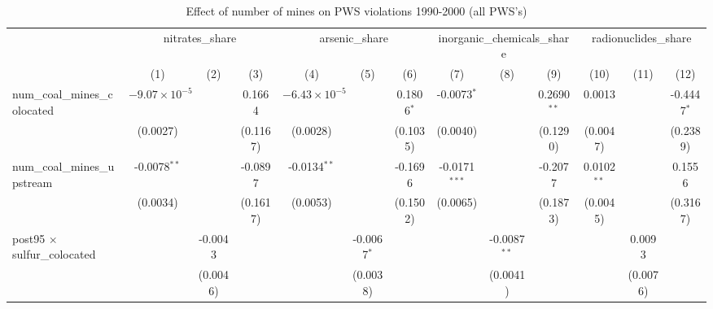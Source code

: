 
\begin{table}[htbp]
   \caption{\label{olsrf2sls_nummine_mine_vio_1990to2000allhucs} Effect of number of mines on PWS violations 1990-2000 (all PWS's)}
   \bigskip
   \centering
   \begin{adjustbox}{width = \textwidth, center}
      \begin{tabular}{lcccccccccccc}
         \toprule
          & \multicolumn{3}{c}{nitrates\_share} & \multicolumn{3}{c}{arsenic\_share} & \multicolumn{3}{c}{inorganic\_chemicals\_share} & \multicolumn{3}{c}{radionuclides\_share}\\
                                                            & (1)                    & (2)           & (3)           & (4)                    & (5)           & (6)           & (7)             & (8)            & (9)           & (10)          & (11)          & (12)\\  
         \midrule 
         num\_coal\_mines\_colocated                        & $-9.07\times 10^{-5}$  &               & 0.1664        & $-6.43\times 10^{-5}$  &               & 0.1806$^{*}$  & -0.0073$^{*}$   &                & 0.2690$^{**}$ & 0.0013        &               & -0.4447$^{*}$\\   
                                                            & (0.0027)               &               & (0.1167)      & (0.0028)               &               & (0.1035)      & (0.0040)        &                & (0.1290)      & (0.0047)      &               & (0.2389)\\   
         num\_coal\_mines\_upstream                         & -0.0078$^{**}$         &               & -0.0897       & -0.0134$^{**}$         &               & -0.1696       & -0.0171$^{***}$ &                & -0.2077       & 0.0102$^{**}$ &               & 0.1556\\   
                                                            & (0.0034)               &               & (0.1617)      & (0.0053)               &               & (0.1502)      & (0.0065)        &                & (0.1873)      & (0.0045)      &               & (0.3167)\\   
         post95 $\times$ sulfur\_colocated                  &                        & -0.0043       &               &                        & -0.0067$^{*}$ &               &                 & -0.0087$^{**}$ &               &               & 0.0093        &   \\   
                                                            &                        & (0.0046)      &               &                        & (0.0038)      &               &                 & (0.0041)       &               &               & (0.0076)      &   \\   

\end{tabular}
\end{adjustbox}
\end{table}
